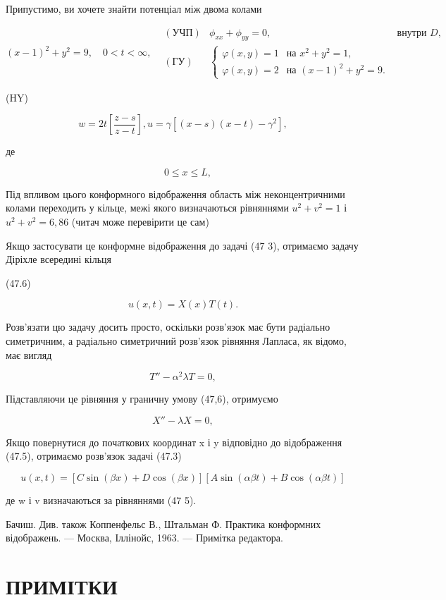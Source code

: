 \documentclass[
  ukrainian,
]{article}
\begin{document}
Припустимо, ви хочете знайти потенціал між двома колами

\[
(x-1)^{2} + y^{2} = 9,
\quad 0 < t < \infty,
\begin{aligned} & (\text{УЧП}) & \phi_{xx} + \phi_{yy} = 0, & \text{внутри } D, \\ & (\text{ГУ}) & \begin{cases} \varphi(x, y) = 1 & \text{на } x^2 + y^2 = 1, \\ \varphi(x, y) = 2 & \text{на } (x - 1)^2 + y^2 = 9. \end{cases} \end{aligned}
\]

(HY)

\[
w = 2t \left[ \frac{z-s}{z-t} \right],
u = \gamma [(x-s)(x-t)-\gamma^2],
\]

де

\[
\quad 0 \le x \le L,
\]

Під впливом цього конформного відображення область між неконцентричними
колами переходить у кільце, межі якого визначаються рівняннями
\(u^2 + v^2 = 1\) і \(u^2 + v^2 = 6,86\) (читач може перевірити це сам)

Якщо застосувати це конформне відображення до задачі (47 3), отримаємо
задачу Діріхле всередині кільця

(47.6)

\[
u(x, t) = X(x) T(t).
\]

Розв'язати цю задачу досить просто, оскільки розв'язок має бути
радіально симетричним, а радіально симетричний розв'язок рівняння
Лапласа, як відомо, має вигляд

\[
T'' - \alpha^2 \lambda T = 0,
\]

Підставляючи це рівняння у граничну умову (47,6), отримуємо

\[
X'' - \lambda X = 0,
\]

Якщо повернутися до початкових координат x і y відповідно до
відображення (47.5), отримаємо розв'язок задачі (47.3)

\[
u(x, t) = [C \sin(\beta x) + D \cos(\beta x)][A \sin(\alpha \beta t) + B \cos(\alpha \beta t)]
\]

де w і v визначаються за рівняннями (47 5).

Бачиш. Див. також Коппенфельс В., Штальман Ф. Практика конформних
відображень. --- Москва, Іллінойс, 1963. --- Примітка редактора.

\section{ПРИМІТКИ}\label{ux43fux440ux438ux43cux456ux442ux43aux438-3}
\end{document}

